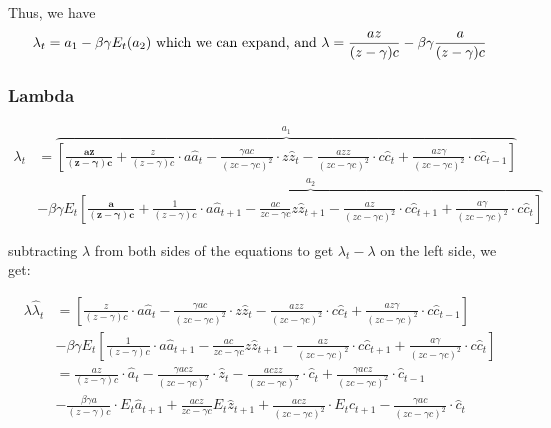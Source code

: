 \documentclass[11pt,preprint, authoryear]{elsarticle}
\numberwithin{equation}{section}
\numberwithin{figure}{section}
\numberwithin{table}{section}
\begin{document}
Thus, we have
\[\lambda_t = a_1 - \beta \gamma E_t (a_2) \text{ which we can expand, and } 
\\
\lambda = \frac{a z}{(z  -\gamma)c } - \beta \gamma \frac{a}{(z-\gamma) c}\]

\hypertarget{lambda}{%
\subsubsection{Lambda}\label{lambda}}

\[\begin{aligned}
\lambda_t &= \overbrace{
\left[ 
\mathbf{\frac{a z}{(z  -\gamma)c }}
+ \frac{z}{(z  -\gamma)c} \cdot a \hat{a}_t 
- \frac{ \gamma a c}{(z c- \gamma c)^{2}} \cdot z \hat{z}_t 
- \frac{a z z}{(z c-\gamma c)^{2}} \cdot c \hat{c}_t
+ \frac{a z \gamma}{(z c-\gamma c)^{2}} \cdot c \hat{c}_{t-1} 
\right]
}^{a_1}\\
&  - \beta \gamma E_t
\overbrace{
\left[
\mathbf{\frac{a}{(z-\gamma) c}}
+ \frac{1}{(z-\gamma) c} \cdot a \hat{a}_{t+1}
- \frac{a c}{z c-\gamma c} z \hat{z}_{t+1}
- \frac{a z}{(z c-\gamma c)^{2}} \cdot c \hat{c}_{t+1}
+ \frac{a \gamma}{(z c-\gamma c)^{2}} \cdot c \hat{c}_t
\right]}^{a_2}
\end{aligned}\]

subtracting \(\lambda\) from both sides of the equations to get
\(\lambda_t - \lambda\) on the left side, we get:

\[\begin{aligned}
\lambda \hat{\lambda}_t &=
\left[ 
\frac{z}{(z  -\gamma)c} \cdot a \hat{a}_t 
- \frac{ \gamma a c}{(z c- \gamma c)^{2}} \cdot z \hat{z}_t 
- \frac{a z z}{(z c-\gamma c)^{2}} \cdot c \hat{c}_t
+ \frac{a z \gamma}{(z c-\gamma c)^{2}} \cdot c \hat{c}_{t-1} 
\right]\\
&  - \beta \gamma E_t
\left[
\frac{1}{(z-\gamma) c} \cdot a \hat{a}_{t+1}
- \frac{a c}{z c-\gamma c} z \hat{z}_{t+1}
- \frac{a z}{(z c-\gamma c)^{2}} \cdot c \hat{c}_{t+1}
+ \frac{a \gamma}{(z c-\gamma c)^{2}} \cdot c \hat{c}_t
\right]\\ 
&= \frac{az}{(z  -\gamma)c} \cdot  \hat{a}_t
- \frac{ \gamma a c z}{(z c- \gamma c)^{2}} \cdot \hat{z}_t 
- \frac{a c z z}{(z c-\gamma c)^{2}} \cdot \hat{c}_t
+ \frac{\gamma a c z }{(z c-\gamma c)^{2}} \cdot \hat{c}_{t-1} \\
& - \frac{\beta \gamma a}{(z-\gamma) c} \cdot E_t \hat{a}_{t+1}
+ \frac{a c z}{z c-\gamma c} E_t \hat{z}_{t+1}
+ \frac{a c z}{(z c-\gamma c)^{2}} \cdot E_t\hat{c}_{t+1}
- \frac{ \gamma a c }{(z c-\gamma c)^{2}} \cdot \hat{c}_t
\end{aligned}\]
\end{document}
